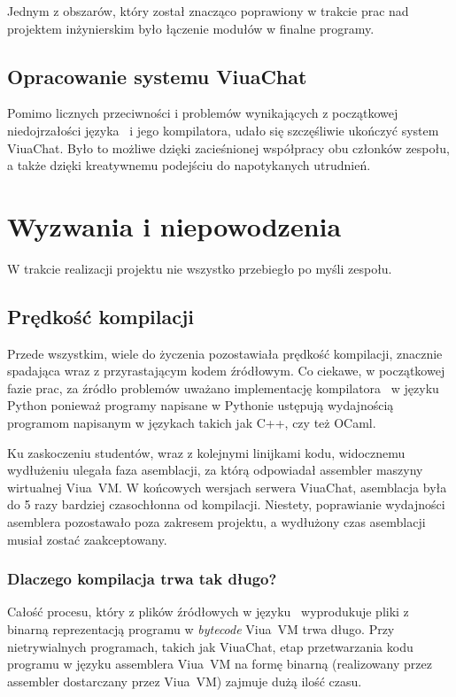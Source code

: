 Jednym z obszarów, który został znacząco poprawiony w trakcie prac nad
projektem inżynierskim było łączenie modułów w finalne programy.

\subsection{Opracowanie systemu ViuaChat}

Pomimo licznych przeciwności i problemów wynikających z początkowej
niedojrzałości języka \ViuAct\ i jego kompilatora, udało się szczęśliwie
ukończyć system ViuaChat. Było to możliwe dzięki zacieśnionej współpracy obu
członków zespołu, a także dzięki kreatywnemu podejściu do napotykanych
utrudnień.

\section{Wyzwania i niepowodzenia}

W trakcie realizacji projektu nie wszystko przebiegło po myśli zespołu.

\subsection{Prędkość kompilacji}

Przede wszystkim, wiele do życzenia pozostawiała prędkość kompilacji, znacznie
spadająca wraz z przyrastającym kodem źródłowym. Co ciekawe, w początkowej fazie
prac, za źródło problemów uważano implementację kompilatora \ViuAct\ w języku
Python ponieważ programy napisane w Pythonie ustępują wydajnością programom
napisanym w językach takich jak C++, czy też OCaml.

Ku zaskoczeniu studentów, wraz z kolejnymi linijkami kodu, widocznemu wydłużeniu
ulegała faza asemblacji, za którą odpowiadał assembler maszyny wirtualnej
Viua~VM. W końcowych wersjach serwera ViuaChat, asemblacja była do 5 razy
bardziej czasochłonna od kompilacji. Niestety, poprawianie wydajności asemblera
pozostawało poza zakresem projektu, a wydłużony czas asemblacji musiał zostać
zaakceptowany.

\subsubsection*{Dlaczego kompilacja trwa tak długo?}

Całość procesu, który z plików źródłowych w języku \ViuAct\ wyprodukuje pliki z
binarną reprezentacją programu w \emph{bytecode} Viua~VM trwa długo. Przy
nietrywialnych programach, takich jak ViuaChat, etap przetwarzania kodu programu
w języku assemblera Viua~VM na formę binarną (realizowany przez assembler
dostarczany przez Viua~VM) zajmuje dużą ilość czasu.

